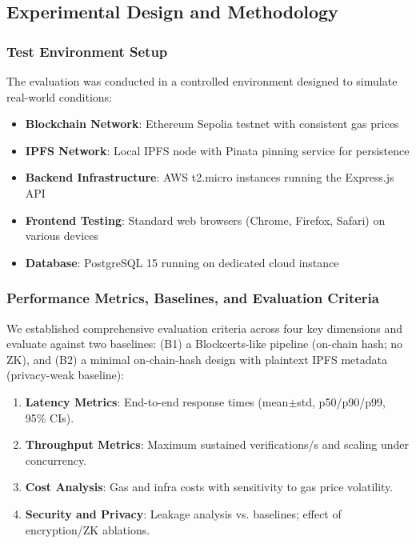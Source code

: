 \documentclass[conference]{IEEEtran}
\begin{document}
\subsection{Experimental Design and Methodology}

\subsubsection{Test Environment Setup}

The evaluation was conducted in a controlled environment designed to simulate real-world conditions:

\begin{itemize}
    \item \textbf{Blockchain Network}: Ethereum Sepolia testnet with consistent gas prices
    \item \textbf{IPFS Network}: Local IPFS node with Pinata pinning service for persistence
    \item \textbf{Backend Infrastructure}: AWS t2.micro instances running the Express.js API
    \item \textbf{Frontend Testing}: Standard web browsers (Chrome, Firefox, Safari) on various devices
    \item \textbf{Database}: PostgreSQL 15 running on dedicated cloud instance
\end{itemize}

\subsubsection{Performance Metrics, Baselines, and Evaluation Criteria}

We established comprehensive evaluation criteria across four key dimensions and evaluate against two baselines: (B1) a Blockcerts-like pipeline (on-chain hash; no ZK), and (B2) a minimal on-chain-hash design with plaintext IPFS metadata (privacy-weak baseline):

\begin{enumerate}
    \item \textbf{Latency Metrics}: End-to-end response times (mean$\pm$std, p50/p90/p99, 95\% CIs).
    \item \textbf{Throughput Metrics}: Maximum sustained verifications/s and scaling under concurrency.
    \item \textbf{Cost Analysis}: Gas and infra costs with sensitivity to gas price volatility.
    \item \textbf{Security and Privacy}: Leakage analysis vs. baselines; effect of encryption/ZK ablations.
\end{enumerate}
\end{document}
